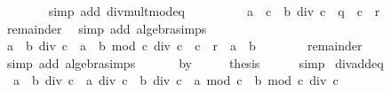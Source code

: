 \begin{isabellebody}
\ \ \ \ \ \ \isamarkupfalse%
\ {\isacharparenleft}{\kern0pt}simp\ add{\isacharcolon}{\kern0pt}\ div{\isacharunderscore}{\kern0pt}mult{\isacharunderscore}{\kern0pt}mod{\isacharunderscore}{\kern0pt}eq{\isacharparenright}{\kern0pt}\isanewline
\ \ \ \ \isamarkupfalse%
\ \isamarkupfalse%
\ {\isachardoublequoteopen}{\isasymdots}\ {\isacharequal}{\kern0pt}\ a\ {\isacharasterisk}{\kern0pt}\ c\ {\isacharasterisk}{\kern0pt}\ {\isacharparenleft}{\kern0pt}b\ div\ c{\isacharparenright}{\kern0pt}\ {\isacharplus}{\kern0pt}\ q\ {\isacharasterisk}{\kern0pt}\ c\ {\isacharplus}{\kern0pt}\ r{\isachardoublequoteclose}\isanewline
\ \ \ \ \ \ \isamarkupfalse%
\ remainder\ \isamarkupfalse%
\ {\isacharparenleft}{\kern0pt}simp\ add{\isacharcolon}{\kern0pt}\ algebra{\isacharunderscore}{\kern0pt}simps{\isacharparenright}{\kern0pt}\isanewline
\ \ \ \ \isamarkupfalse%
\ \isamarkupfalse%
\ {\isachardoublequoteopen}{\isacharparenleft}{\kern0pt}a\ {\isacharasterisk}{\kern0pt}\ {\isacharparenleft}{\kern0pt}b\ div\ c{\isacharparenright}{\kern0pt}\ {\isacharplus}{\kern0pt}\ a\ {\isacharasterisk}{\kern0pt}\ {\isacharparenleft}{\kern0pt}b\ mod\ c{\isacharparenright}{\kern0pt}\ div\ c{\isacharparenright}{\kern0pt}\ {\isacharasterisk}{\kern0pt}\ c\ {\isacharplus}{\kern0pt}\ r\ {\isacharequal}{\kern0pt}\ a\ {\isacharasterisk}{\kern0pt}\ b{\isachardoublequoteclose}\isanewline
\ \ \ \ \ \ \isamarkupfalse%
\ remainder{\isacharparenleft}{\kern0pt}{}{\isacharminus}{\kern0pt}{}{\isacharparenright}{\kern0pt}\ \isamarkupfalse%
\ {\isacharparenleft}{\kern0pt}simp\ add{\isacharcolon}{\kern0pt}\ algebra{\isacharunderscore}{\kern0pt}simps{\isacharparenright}{\kern0pt}\isanewline
\ \ \isamarkupfalse%
\isanewline
{}\isamarkupfalse%
\isanewline
\ \ \isamarkupfalse%
\ by{}\isanewline
\ \ \isamarkupfalse%
\ \isamarkupfalse%
\ {\isacharquery}{\kern0pt}thesis\isanewline
\ \ \ \ \isamarkupfalse%
\ simp\isanewline
{}\isamarkupfalse%
%
\endisatagproof
{\isafoldproof}%
%
\isadelimproof
\isanewline
%
\endisadelimproof
\isanewline
{}\isamarkupfalse%
\ div{\isacharunderscore}{\kern0pt}add{}{\isacharunderscore}{\kern0pt}eq{\isacharcolon}{\kern0pt}\isanewline
\ \ {\isachardoublequoteopen}{\isacharparenleft}{\kern0pt}a\ {\isacharplus}{\kern0pt}\ b{\isacharparenright}{\kern0pt}\ div\ c\ {\isacharequal}{\kern0pt}\ a\ div\ c\ {\isacharplus}{\kern0pt}\ b\ div\ c\ {\isacharplus}{\kern0pt}\ {\isacharparenleft}{\kern0pt}a\ mod\ c\ {\isacharplus}{\kern0pt}\ b\ mod\ c{\isacharparenright}{\kern0pt}\ div\ c{\isachardoublequoteclose}\isanewline

\end{isabellebody}
